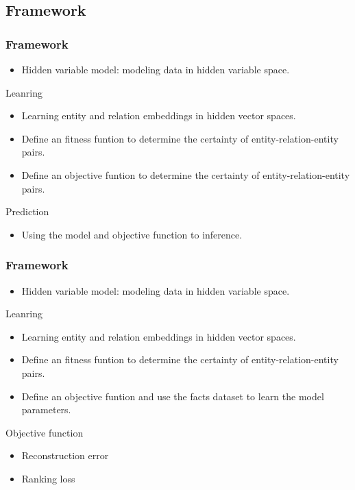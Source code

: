\documentclass[pdf,10pt]{beamer}
\begin{document}
\subsection{Framework}
\begin{frame}
	\frametitle{Framework}
	\begin{itemize}
		\item Hidden variable model: modeling data in hidden variable space.
	\end{itemize}
	\begin{block}{Leanring}
		\begin{itemize}
			\item Learning entity and relation embeddings in hidden vector spaces.
			\item Define an fitness funtion to determine the certainty of entity-relation-entity pairs.
			\item Define an objective funtion to determine the certainty of entity-relation-entity pairs.
		\end{itemize}
	\end{block}
	\begin{alertblock}{Prediction}
		\begin{itemize}
			\item Using the model and objective function to inference.
		\end{itemize}
	\end{alertblock}
\end{frame}

\begin{frame}
	\frametitle{Framework}
	\begin{itemize}
		\item Hidden variable model: modeling data in hidden variable space.
	\end{itemize}
	\begin{block}{Leanring}
		\begin{itemize}
			\item Learning entity and relation embeddings in hidden vector spaces.
			\item Define an fitness funtion to determine the certainty of entity-relation-entity pairs.
			\item Define an objective funtion and use the facts dataset to learn the model parameters.
		\end{itemize}
	\end{block}
	\begin{alertblock}{Objective function}
		\begin{itemize}
			\item Reconstruction error
			\item Ranking loss
		\end{itemize}
	\end{alertblock}
\end{frame}
\end{document}
